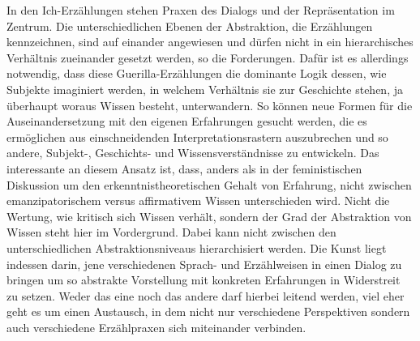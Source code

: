 In den Ich-Erzählungen stehen Praxen des Dialogs und der Repräsentation im
Zentrum. Die unterschiedlichen Ebenen der Abstraktion, die Erzählungen
kennzeichnen, sind auf einander angewiesen und dürfen nicht in ein
hierarchisches Verhältnis zueinander gesetzt werden, so die Forderungen. Dafür
ist es allerdings notwendig, dass diese Guerilla-Erzählungen die dominante Logik
dessen, wie Subjekte imaginiert werden, in welchem Verhältnis sie zur Geschichte
stehen, ja überhaupt woraus Wissen besteht, unterwandern. So können neue Formen
für die Auseinandersetzung mit den eigenen Erfahrungen gesucht werden, die es
ermöglichen aus einschneidenden Interpretationsrastern auszubrechen und so
andere, Subjekt-, Geschichts- und Wissensverständnisse zu entwickeln. Das
interessante an diesem Ansatz ist, dass, anders als in der feministischen
Diskussion um den erkenntnistheoretischen Gehalt von Erfahrung, nicht zwischen
emanzipatorischem versus affirmativem Wissen unterschieden wird. Nicht die
Wertung, wie kritisch sich Wissen verhält, sondern der Grad der Abstraktion von
Wissen steht hier im Vordergrund. Dabei kann nicht zwischen den
unterschiedlichen Abstraktionsniveaus hierarchisiert werden. Die Kunst liegt
indessen darin, jene verschiedenen Sprach- und Erzählweisen in einen Dialog zu
bringen um so abstrakte Vorstellung mit konkreten Erfahrungen in Widerstreit zu
setzen. Weder das eine noch das andere darf hierbei leitend werden, viel eher
geht es um einen Austausch, in dem nicht nur verschiedene Perspektiven sondern
auch verschiedene Erzählpraxen sich miteinander verbinden.

